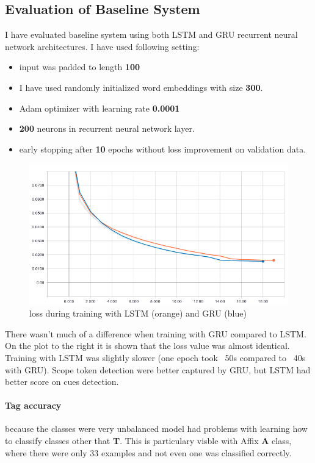 \documentclass{article}
\begin{document}
\subsection{Evaluation of Baseline System}
I have evaluated baseline system using both LSTM and GRU recurrent neural network architectures.
I have used following setting:
\begin{itemize}
\item input was padded to length \textbf{100}
\item I have used randomly initialized word embeddings with size \textbf{300}.
\item Adam optimizer with learning rate \textbf{0.0001}
\item \textbf{200} neurons in recurrent neural network layer.
\item early stopping after \textbf{10} epochs without loss improvement on validation data.
\end{itemize}

\begin{figure}
    \centering
    \includegraphics[scale=0.25]{../figures/loss.png}
    \caption {loss during training with LSTM (orange) and GRU (blue)}
\end{figure}

There wasn't much of a difference when training with GRU compared to LSTM.
On the plot to the right it is shown that the loss value was almost identical.
Training with LSTM was slightly slower (one epoch took ~50s compared to ~40s with GRU).
Scope token detection were better captured by GRU, but LSTM had better score on
cues detection.

\paragraph{Tag accuracy} because the classes were very unbalanced model had problems
with learning how to classify classes other that \textbf{T}. This is particulary visble
with Affix \textbf{A} class, where there were only 33 examples and not even one was classified
correctly.
\end{document}
